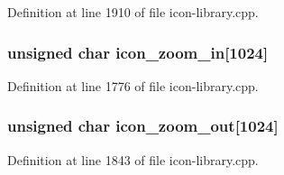 Definition at line 1910 of file icon-\/library.cpp.

\hypertarget{icon-library_8cpp_a58218e6d1a56e2333eb100acf483c745}{
\subsubsection[{icon\_\-zoom\_\-in}]{\setlength{\rightskip}{0pt plus 5cm}unsigned char {\bf icon\_\-zoom\_\-in}\mbox{[}1024\mbox{]}}}
\label{icon-library_8cpp_a58218e6d1a56e2333eb100acf483c745}


Definition at line 1776 of file icon-\/library.cpp.

\hypertarget{icon-library_8cpp_af79cc607708d1ac758ce315d5fea778a}{
\subsubsection[{icon\_\-zoom\_\-out}]{\setlength{\rightskip}{0pt plus 5cm}unsigned char {\bf icon\_\-zoom\_\-out}\mbox{[}1024\mbox{]}}}
\label{icon-library_8cpp_af79cc607708d1ac758ce315d5fea778a}


Definition at line 1843 of file icon-\/library.cpp.

